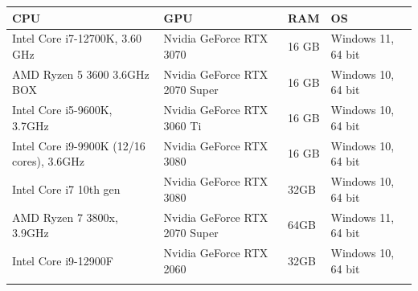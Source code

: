 \begin{center}
  \begin{tabular}{ | m{5cm} | m{3.5cm}| m{2cm}|m{4cm} |}
  \hline
  CPU& GPU& RAM& OS\\
  \hline
    Intel Core i7-12700K, 3.60 GHz& Nvidia GeForce RTX 3070& 16 GB& Windows 11, 64 bit\\ %
  \hline
    AMD Ryzen 5 3600 3.6GHz BOX& Nvidia GeForce RTX 2070 Super& 16 GB& Windows 10, 64 bit\\ %
  \hline
    Intel Core i5-9600K, 3.7GHz& Nvidia GeForce RTX 3060 Ti& 16 GB& Windows 10, 64 bit\\ %
  \hline
    Intel Core i9-9900K (12/16 cores), 3.6GHz& Nvidia GeForce RTX 3080& 16 GB& Windows 10, 64 bit\\ %
  \hline
    Intel Core i7 10th gen& Nvidia GeForce RTX 3080& 32GB& Windows 10, 64 bit\\ %
  \hline
    AMD Ryzen 7 3800x, 3.9GHz& Nvidia GeForce RTX 2070 Super& 64GB& Windows 11, 64 bit\\ %
  \hline
    Intel Core i9-12900F& Nvidia GeForce RTX 2060& 32GB& Windows 10, 64 bit\\ %
  \label{pc-specs-table}
\end{tabular}
\end{center}
